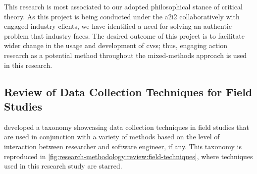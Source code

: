 This research is most associated to our adopted philosophical stance of critical theory. As this project is being conducted under the \gls{a2i2} collaboratively with engaged industry clients, we have identified a need for solving an authentic problem that industry faces. The desired outcome of this project is to facilitate wider change in the usage and development of \glspl{cvs}; thus, engaging action research as a potential method throughout the mixed-methods approach is used in this research.

\subsection{Review of Data Collection Techniques for Field Studies}
\label{ssec:research-methodology:review:techniques}

\citeauthor{Singer:2007tu} developed a taxonomy \citep{Singer:2007tu,Lethbridge:2005jv} showcasing data collection techniques in field studies that are used in conjunction with a variety of methods based on the level of interaction between researcher and software engineer, if any. This taxonomy is reproduced in \cref{fig:research-methodology:review:field-techniques}, where techniques used in this research study are starred.

